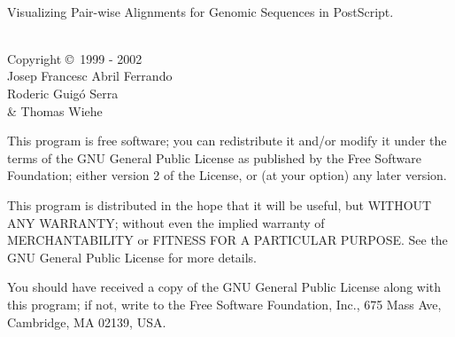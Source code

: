 %
%
%
%
%

\begin{center}
\begin{ttfamily}
\\[20pt]

\begin{flushleft}
Visualizing Pair-wise Alignments for Genomic Sequences in PostScript.
\end{flushleft}\vspace{1cm}

\\[28pt]

Copyright \copyright\ 1999 - 2002 \\
Josep Francesc Abril Ferrando{\,\footnotesize\raisebox{0.75ex}{$\dag$}} \\
Roderic Guig\'o Serra{\,\footnotesize\raisebox{0.75ex}{$\dag$}} \\
\& Thomas Wiehe{\,\footnotesize\raisebox{0.75ex}{$\ddag$}}
\vspace{15pt}

\begin{flushleft}
This program is free software; you can redistribute it and/or modify
it under the terms of the GNU General Public License as published by
the Free Software Foundation; either version 2 of the License, or
(at your option) any later version.\vspace{2.5ex}

This program is distributed in the hope that it will be useful,
but WITHOUT ANY WARRANTY; without even the implied warranty of
MERCHANTABILITY or FITNESS FOR A PARTICULAR PURPOSE.  See the
GNU General Public License for more details.\vspace{2.5ex}

You should have received a copy of the GNU General Public License
along with this program; if not, write to the Free Software
Foundation, Inc., 675 Mass Ave, Cambridge, MA 02139, USA.\vspace{20pt}


\end{flushleft}
\end{ttfamily}
\end{center}
